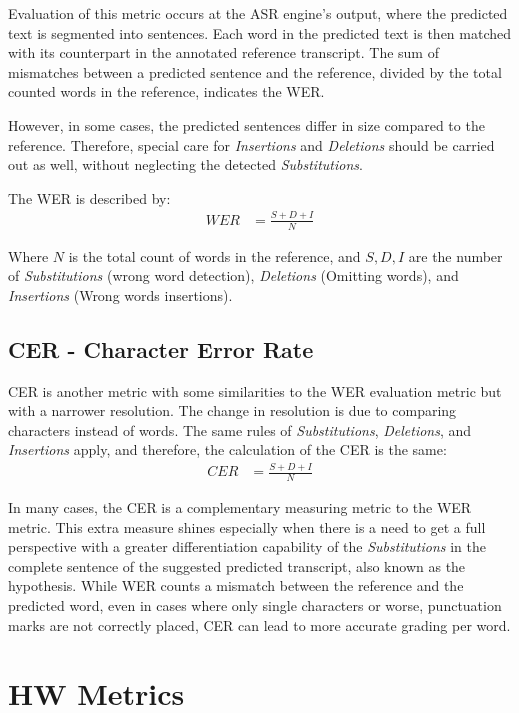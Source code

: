 Evaluation of this metric occurs at the ASR engine's output, 
where the predicted text is segmented into sentences. 
Each word in the predicted
text is then matched with its counterpart in the 
annotated reference transcript. 
The sum of mismatches between a predicted sentence and the reference, 
divided by the total counted words in the reference, indicates the WER.

However, in some cases, the predicted sentences differ in size compared
to the reference. Therefore, special care for \emph{Insertions}
and \emph{Deletions} should be carried out as well, without neglecting
the detected \emph{Substitutions}.

The WER is described by:
\begin{align}
    WER & = \frac{S + D + I}{N}
\end{align}

Where \(N\) is the total count of words in the reference,
and \(S,D,I\) are the number of \emph{Substitutions} (wrong word detection),
\emph{Deletions} (Omitting words),
and \emph{Insertions} (Wrong words insertions).

\subsection{CER - Character Error Rate}
CER is another metric with some similarities to the 
WER evaluation metric but with a narrower resolution.
The change in resolution is due to comparing characters instead of words.
The same rules of \emph{Substitutions}, \emph{Deletions}, and \emph{Insertions}
apply, and therefore, the calculation of the CER is the same:
\begin{align}
    CER & = \frac{S + D + I}{N}
\end{align}

In many cases, the CER\cite{_isword} is a complementary 
measuring metric to the WER
metric.
This extra measure shines especially 
when there is a need to get a full perspective 
with a greater differentiation capability of the 
\emph{Substitutions} in the complete sentence 
of the suggested predicted transcript,
 also known as the hypothesis. 
While WER counts a mismatch between the reference and the predicted 
word, even in cases where only single characters or worse, 
punctuation marks are not correctly placed, CER can lead to 
more accurate grading per word.

\section{HW Metrics}
